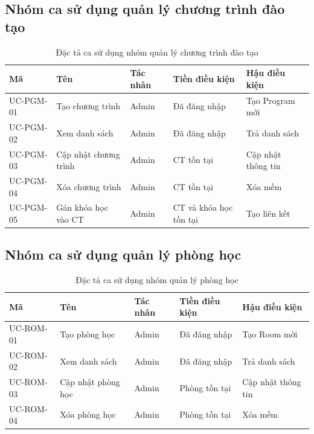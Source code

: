 \documentclass[../DoAn.tex]{subfiles}
\begin{document}
\subsection{Nhóm ca sử dụng quản lý chương trình đào tạo}

\begin{table}[H]
\centering
\caption{Đặc tả ca sử dụng nhóm quản lý chương trình đào tạo}
\label{table:bang2.7}
\begin{tabular}{|l|p{3cm}|l|p{2.5cm}|p{3cm}|}
\hline
\textbf{Mã} & \textbf{Tên} & \textbf{Tác nhân} & \textbf{Tiền điều kiện} & \textbf{Hậu điều kiện} \\ \hline
UC-PGM-01 & Tạo chương trình & Admin & Đã đăng nhập & Tạo Program mới \\ \hline
UC-PGM-02 & Xem danh sách & Admin & Đã đăng nhập & Trả danh sách \\ \hline
UC-PGM-03 & Cập nhật chương trình & Admin & CT tồn tại & Cập nhật thông tin \\ \hline
UC-PGM-04 & Xóa chương trình & Admin & CT tồn tại & Xóa mềm \\ \hline
UC-PGM-05 & Gán khóa học vào CT & Admin & CT và khóa học tồn tại & Tạo liên kết \\ \hline
\end{tabular}
\end{table}

\subsection{Nhóm ca sử dụng quản lý phòng học}

\begin{table}[H]
\centering
\caption{Đặc tả ca sử dụng nhóm quản lý phòng học}
\label{table:bang2.8}
\begin{tabular}{|l|p{3cm}|l|p{2.5cm}|p{3cm}|}
\hline
\textbf{Mã} & \textbf{Tên} & \textbf{Tác nhân} & \textbf{Tiền điều kiện} & \textbf{Hậu điều kiện} \\ \hline
UC-ROM-01 & Tạo phòng học & Admin & Đã đăng nhập & Tạo Room mới \\ \hline
UC-ROM-02 & Xem danh sách & Admin & Đã đăng nhập & Trả danh sách \\ \hline
UC-ROM-03 & Cập nhật phòng học & Admin & Phòng tồn tại & Cập nhật thông tin \\ \hline
UC-ROM-04 & Xóa phòng học & Admin & Phòng tồn tại & Xóa mềm \\ \hline
\end{tabular}
\end{table}
\end{document}
